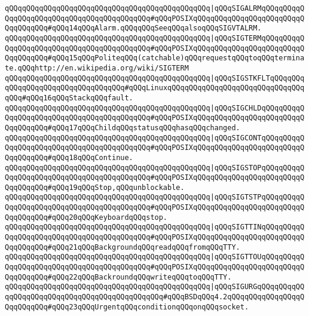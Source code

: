 \verb|qQQqqQQqqQQqqQQqqQQqqQQqqQQqqQQqqQQqqQQqqQQqqQQq|\verb#|qQQqSIGALRMqQQqqQQqqQQqqQQqqQQqqQQqqQQqqQQqqQQqqQQqqQQq#\verb|#qQQqPOSIXqQQqqQQqqQQqqQQqqQQqqQQqqQQqqQQqqQQq#qQQq14qQQqAlarm.qQQqqQQqSeeqQQqalsoqQQqSIGVTALRM.|\newline
\verb|qQQqqQQqqQQqqQQqqQQqqQQqqQQqqQQqqQQqqQQqqQQqqQQq|\verb#|qQQqSIGTERMqQQqqQQqqQQqqQQqqQQqqQQqqQQqqQQqqQQqqQQqqQQq#\verb|#qQQqPOSIXqQQqqQQqqQQqqQQqqQQqqQQqqQQqqQQqqQQq#qQQq15qQQqPoliteqQQq(catchable)qQQqrequestqQQqtoqQQqterminate.qQQqhttp://en.wikipedia.org/wiki/SIGTERM|\newline
\verb|qQQqqQQqqQQqqQQqqQQqqQQqqQQqqQQqqQQqqQQqqQQqqQQq|\verb#|qQQqSIGSTKFLTqQQqqQQqqQQqqQQqqQQqqQQqqQQqqQQqqQQq#\verb|#qQQqLinuxqQQqqQQqqQQqqQQqqQQqqQQqqQQqqQQqqQQq#qQQq16qQQqStackqQQqfault.|\newline
\verb|qQQqqQQqqQQqqQQqqQQqqQQqqQQqqQQqqQQqqQQqqQQqqQQq|\verb#|qQQqSIGCHLDqQQqqQQqqQQqqQQqqQQqqQQqqQQqqQQqqQQqqQQqqQQq#\verb|#qQQqPOSIXqQQqqQQqqQQqqQQqqQQqqQQqqQQqqQQqqQQq#qQQq17qQQqChildqQQqstatusqQQqhasqQQqchanged.|\newline
\verb|qQQqqQQqqQQqqQQqqQQqqQQqqQQqqQQqqQQqqQQqqQQqqQQq|\verb#|qQQqSIGCONTqQQqqQQqqQQqqQQqqQQqqQQqqQQqqQQqqQQqqQQqqQQq#\verb|#qQQqPOSIXqQQqqQQqqQQqqQQqqQQqqQQqqQQqqQQqqQQq#qQQq18qQQqContinue.|\newline
\verb|qQQqqQQqqQQqqQQqqQQqqQQqqQQqqQQqqQQqqQQqqQQqqQQq|\verb#|qQQqSIGSTOPqQQqqQQqqQQqqQQqqQQqqQQqqQQqqQQqqQQqqQQqqQQq#\verb|#qQQqPOSIXqQQqqQQqqQQqqQQqqQQqqQQqqQQqqQQqqQQq#qQQq19qQQqStop,qQQqunblockable.|\newline
\verb|qQQqqQQqqQQqqQQqqQQqqQQqqQQqqQQqqQQqqQQqqQQqqQQq|\verb#|qQQqSIGTSTPqQQqqQQqqQQqqQQqqQQqqQQqqQQqqQQqqQQqqQQqqQQq#\verb|#qQQqPOSIXqQQqqQQqqQQqqQQqqQQqqQQqqQQqqQQqqQQq#qQQq20qQQqKeyboardqQQqstop.|\newline
\verb|qQQqqQQqqQQqqQQqqQQqqQQqqQQqqQQqqQQqqQQqqQQqqQQq|\verb#|qQQqSIGTTINqQQqqQQqqQQqqQQqqQQqqQQqqQQqqQQqqQQqqQQqqQQq#\verb|#qQQqPOSIXqQQqqQQqqQQqqQQqqQQqqQQqqQQqqQQqqQQq#qQQq21qQQqBackgroundqQQqreadqQQqfromqQQqTTY.|\newline
\verb|qQQqqQQqqQQqqQQqqQQqqQQqqQQqqQQqqQQqqQQqqQQqqQQq|\verb#|qQQqSIGTTOUqQQqqQQqqQQqqQQqqQQqqQQqqQQqqQQqqQQqqQQqqQQq#\verb|#qQQqPOSIXqQQqqQQqqQQqqQQqqQQqqQQqqQQqqQQqqQQq#qQQq22qQQqBackroundqQQqwriteqQQqtoqQQqTTY.|\newline
\verb|qQQqqQQqqQQqqQQqqQQqqQQqqQQqqQQqqQQqqQQqqQQqqQQq|\verb#|qQQqSIGURGqQQqqQQqqQQqqQQqqQQqqQQqqQQqqQQqqQQqqQQqqQQqqQQq#\verb|#qQQqBSDqQQq4.2qQQqqQQqqQQqqQQqqQQqqQQqqQQq#qQQq23qQQqUrgentqQQqconditionqQQqonqQQqsocket.|\newline
